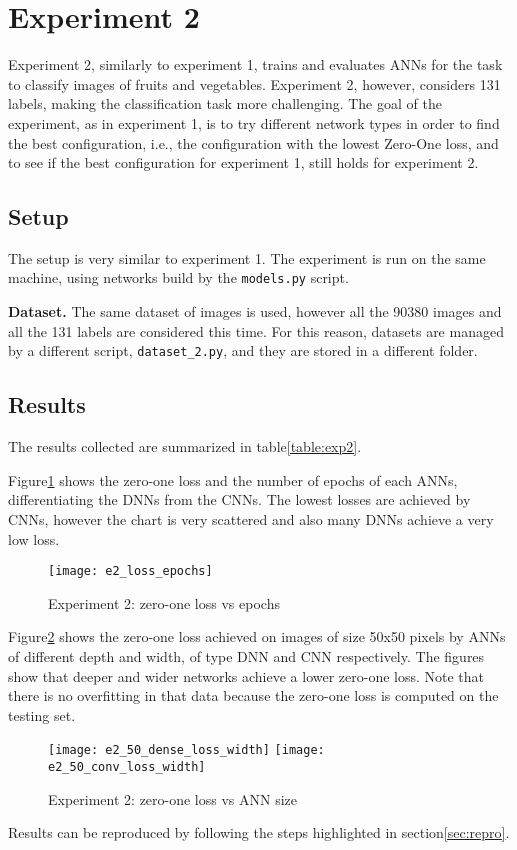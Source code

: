\section{Experiment 2}
\label{sec:exp2}
Experiment 2, similarly to experiment 1, trains and evaluates ANNs for the task to classify images of fruits and vegetables. Experiment 2, however, considers 131 labels, making the classification task more challenging. The goal of the experiment, as in experiment 1, is to try different network types in order to find the best configuration, i.e., the configuration with the lowest Zero-One loss, and to see if the best configuration for experiment 1, still holds for experiment 2.

\subsection{Setup}
The setup is very similar to experiment 1. The experiment is run on the same machine, using networks build by the \texttt{models.py} script.

\textbf{Dataset.} The same dataset of images is used, however all the 90380 images and all the 131 labels are considered this time. For this reason, datasets are managed by a different script, \texttt{dataset\_2.py}, and they are stored in a different folder.

\subsection{Results}
The results collected are summarized in table\ref{table:exp2}.


Figure\ref{fig:e2_loss_epochs} shows the zero-one loss and the number of epochs of each ANNs, differentiating the DNNs from the CNNs. The lowest losses are achieved by CNNs, however the chart is very scattered and also many DNNs achieve a very low loss.
\begin{figure}
\texttt{[image: e2\_loss\_epochs]}
\caption{Experiment 2: zero-one loss vs epochs}\label{fig:e2_loss_epochs}
\end{figure}

Figure\ref{fig:e2_50_loss_width} shows the zero-one loss achieved on images of size 50x50 pixels by ANNs of different depth and width, of type DNN and CNN respectively. The figures show that deeper and wider networks achieve a lower zero-one loss. Note that there is no overfitting in that data because the zero-one loss is computed on the testing set.
\begin{figure}
\texttt{[image: e2\_50\_dense\_loss\_width]}
\texttt{[image: e2\_50\_conv\_loss\_width]}
\caption{Experiment 2: zero-one loss vs ANN size}\label{fig:e2_50_loss_width}
\end{figure}

Results can be reproduced by following the steps highlighted in section\ref{sec:repro}.
